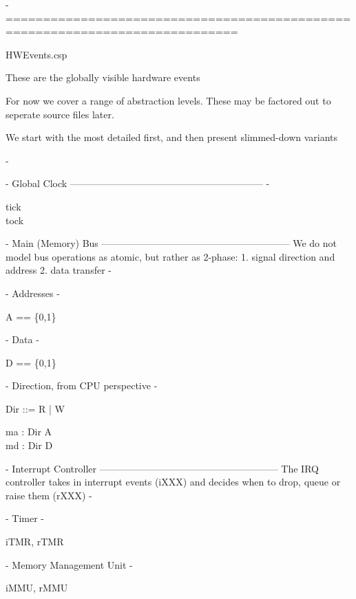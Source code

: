 {- =============================================================================

	HWEvents.csp


 These are the globally visible hardware events

 For now we cover a range of abstraction levels.
 These may be factored out to seperate source files later.

 We start with the most detailed first,
 and then present slimmed-down variants

-}


{-  Global Clock ------------------------------------------------------------ -}
\begin{circus}
\circchannel tick\\  %
\circchannel tock  %
\end{circus}

{- Main (Memory) Bus -----------------------------------------------------------
  We do not model bus operations as atomic, but rather as 2-phase:
   1. signal direction and address
   2. data transfer -}

{- Addresses -}
\begin{circus}
A == \{0,1\}
\end{circus}

{- Data -}
\begin{circus}
D == \{0,1\}
\end{circus}

{- Direction, from CPU perspective -}
\begin{circus}
Dir ::= R  %
        | W  %
\end{circus}
\begin{circus}

\circchannel ma : Dir \cross A\\  %
\circchannel md : Dir \cross D  %
\end{circus}


{- Interrupt Controller --------------------------------------------------------
   The IRQ controller takes in interrupt events (iXXX)
   and decides when to drop, queue or raise them (rXXX)
-}

{- Timer -}
\begin{circus}

\circchannel iTMR, rTMR
\end{circus}

{- Memory Management Unit -}
\begin{circus}

\circchannel iMMU, rMMU
\end{circus}

